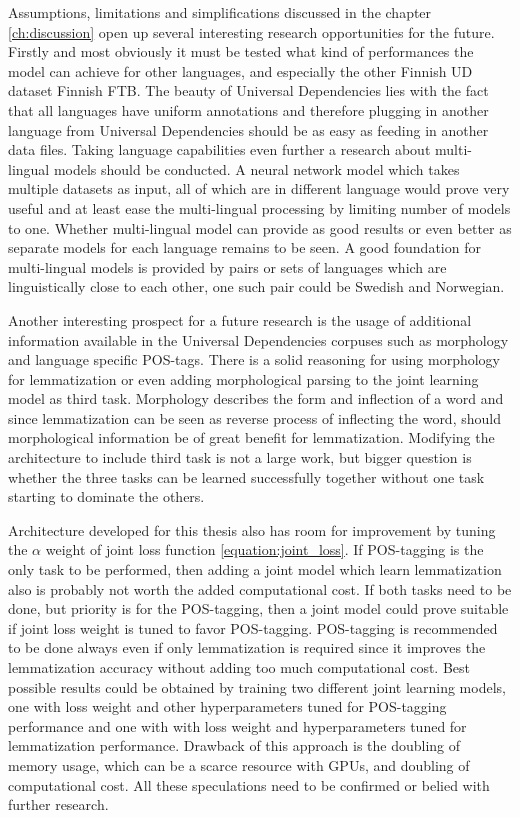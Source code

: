 \documentclass[12pt,a4paper,english
]{tutthesis}
\begin{document}
Assumptions, limitations and simplifications discussed in the chapter \ref{ch:discussion} open up several interesting research opportunities for the future. Firstly and most obviously it must be tested what kind of performances the model can achieve for other languages, and especially the other Finnish UD dataset Finnish FTB. The beauty of Universal Dependencies lies with the fact that all languages have uniform annotations and therefore plugging in another language from Universal Dependencies should be as easy as feeding in another data files. Taking language capabilities even further a research about multi-lingual models should be conducted. A neural network model which takes multiple datasets as input, all of which are in different language would prove very useful and at least ease the multi-lingual processing by limiting number of models to one. Whether multi-lingual model can provide as good results or even better as separate models for each language remains to be seen. A good foundation for multi-lingual models is provided by pairs or sets of languages which are linguistically close to each other, one such pair could be Swedish and Norwegian.

Another interesting prospect for a future research is the usage of additional information available in the Universal Dependencies corpuses such as morphology and language specific POS-tags. There is a solid reasoning for using morphology for lemmatization or even adding morphological parsing to the joint learning model as third task. Morphology describes the form and inflection of a word and since lemmatization can be seen as reverse process of inflecting the word, should morphological information be of great benefit for lemmatization. Modifying the architecture to include third task is not a large work, but bigger question is whether the three tasks can be learned successfully together without one task starting to dominate the others.

Architecture developed for this thesis also has room for improvement by tuning the $\alpha$ weight of joint loss function \ref{equation:joint_loss}. If POS-tagging is the only task to be performed, then adding a joint model which learn lemmatization also is probably not worth the added computational cost. If both tasks need to be done, but priority is for the POS-tagging, then a joint model could prove suitable if joint loss weight is tuned to favor POS-tagging. POS-tagging is recommended to be done always even if only lemmatization is required since it improves the lemmatization accuracy without adding too much computational cost. Best possible results could be obtained by training two different joint learning models, one with loss weight and other hyperparameters tuned for POS-tagging performance and one with with loss weight and hyperparameters tuned for lemmatization performance. Drawback of this approach is the doubling of memory usage, which can be a scarce resource with GPUs, and doubling of computational cost. All these speculations need to be confirmed or belied with further research.
\end{document}
